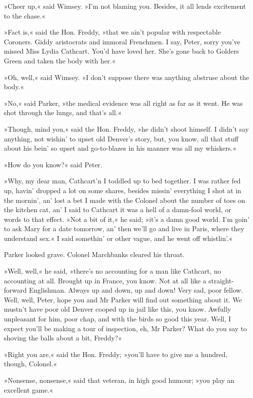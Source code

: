 »Cheer up,« said Wimsey. »I'm not blaming you. Besides, it all lends excitement to the chase.«

»Fact is,« said the Hon. Freddy, »that we ain't popular with respectable Coroners. Giddy aristocrats and immoral Frenchmen. I say, Peter, sorry you've missed Miss Lydia Cathcart. You'd have loved her. She's gone back to Golders Green and taken the body with her.«

»Oh, well,« said Wimsey. »I don't suppose there was anything abstruse about the body.«

»No,« said Parker, »the medical evidence was all right as far as it went. He was shot through the lungs, and that's all.«

»Though, mind you,« said the Hon. Freddy, »he didn't shoot himself. I didn't say anything, not wishin' to upset old Denver's story, but, you know, all that stuff about his bein' so upset and go-to-blazes in his manner was all my whiskers.«

»How do you know?« said Peter.

»Why, my dear man, Cathcart'n I toddled up to bed together. I was rather fed up, havin' dropped a lot on some shares, besides missin' everything I shot at in the mornin', an' lost a bet I made with the Colonel about the number of toes on the kitchen cat, an' I said to Cathcart it was a hell of a damn-fool world, or words to that effect. »Not a bit of it,« he said; »it's a damn good world. I'm goin' to ask Mary for a date tomorrow, an' then we'll go and live in Paris, where they understand sex.« I said somethin' or other vague, and he went off whistlin'.«

Parker looked grave. Colonel Marchbanks cleared his throat.

»Well, well,« he said, »there's no accounting for a man like Cathcart, no accounting at all. Brought up in France, you know. Not at all like a straight-forward Englishman. Always up and down, up and down! Very sad, poor fellow. Well, well, Peter, hope you and Mr Parker will find out something about it. We mustn't have poor old Denver cooped up in jail like this, you know. Awfully unpleasant for him, poor chap, and with the birds so good this year. Well, I expect you'll be making a tour of inspection, eh, Mr Parker? What do you say to shoving the balls about a bit, Freddy?«

»Right you are,« said the Hon. Freddy; »you'll have to give me a hundred, though, Colonel.«

»Nonsense, nonsense,« said that veteran, in high good humour; »you play an excellent game.«


